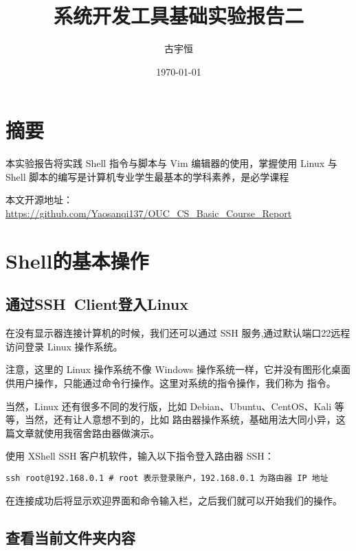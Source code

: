 \documentclass[UTF8]{gyh}
\title{系统开发工具基础实验报告二}
\author{古宇恒}
\date{\today}
\begin{document}
\fancyfoot[C]{\thepage}

\maketitle
\tableofcontents
\newpage

\section{摘要}
本实验报告将实践 Shell 指令与脚本与 Vim 编辑器的使用，掌握使用 Linux 与 Shell 脚本的编写是计算机专业学生最基本的学科素养，是必学课程

本文开源地址：\href{https://www.google.com/url?sa=E&q=https%3A%2F%2Fgithub.com%2FYaosanqi137%2FOUC%5C_CS%5C_Basic%5C_Course%5C_Report}{https://github.com/Yaosanqi137/OUC\_CS\_Basic\_Course\_Report}

\section{Shell的基本操作}

\subsection{通过SSH\ Client登入Linux}

在没有显示器连接计算机的时候，我们还可以通过 SSH 服务,通过默认端口22远程访问登录 Linux 操作系统。

注意，这里的 Linux 操作系统不像 Windows 操作系统一样，它并没有图形化桌面供用户操作，只能通过命令行操作。这里对系统的指令操作，我们称为  指令。

当然，Linux 还有很多不同的发行版，比如 Debian、Ubuntu、CentOS、Kali 等等，当然，还有让人意想不到的，比如  路由器操作系统，基础用法大同小异，这篇文章就使用我宿舍路由器做演示。

使用 XShell SSH 客户机软件，输入以下指令登入路由器 SSH：

\begin{lstlisting}
ssh root@192.168.0.1 # root 表示登录账户，192.168.0.1 为路由器 IP 地址
\end{lstlisting}

在连接成功后将显示欢迎界面和命令输入栏，之后我们就可以开始我们的操作。


\subsection{查看当前文件夹内容}
\end{document}
